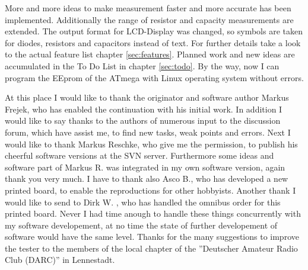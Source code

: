 More and more ideas to make measurement faster and more accurate has been implemented.
Additionally the range of resistor and capacity measurements are extended.
The output format for LCD-Display was changed, so symbols are taken for diodes, resistors and capacitors instead of text.
For further details take a look to the actual feature list chapter \ref{sec:features}.
Planned work and new ideas are accumulated in the To Do List in chapter \ref{sec:todo}.
By the way, now I can program the EEprom of the ATmega with Linux operating system without errors.

At this place I would like to thank the originator and software author Markus Frejek, who has enabled the continuation
with his initial work.
In addition I would like to say thanks to the authors of numerous input to the discussion forum, which have assist me, to
find new tasks, weak points and errors.
Next I would like to thank Markus Reschke, who give me the permission, to publish his cheerful software versions at the
SVN server. Furthermore some ideas and software part of Markus R. was integrated in my own software version,
again thank you very much.
I have to thank also Asco B., who has developed a new printed board, to enable the reproductions for other hobbyists.
Another thank I would like to send to Dirk W. , who has handled the omnibus order for this printed board.
Never I had time anough to handle these things concurrently with my software developement, at no time the state of further
developement of software would have the same level.
Thanks for the many suggestions to improve the tester to the members of the local chapter of the ''Deutscher Amateur Radio Club (DARC)''
in Lennestadt.

